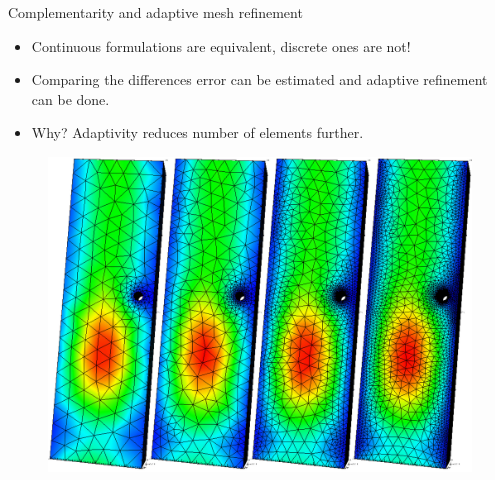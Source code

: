 \documentclass{beamer}
\begin{document}
\begin{frame}{Complementarity and adaptive mesh refinement}
    \begin{minipage}{0.60\textwidth}
        \begin{itemize}
            \item Continuous formulations are equivalent, discrete ones are not!
            \item Comparing the differences error can be estimated and adaptive refinement can be done.
            \item Why? Adaptivity reduces number of elements further.
            \end{itemize}
    \end{minipage}
    \hfill
    \begin{minipage}{0.25\textwidth}
    \begin{figure}
        \includegraphics[width=\textwidth]{img/refinement.jpg}
    \end{figure}
\end{minipage}
\hfill


\end{frame}
\end{document}

